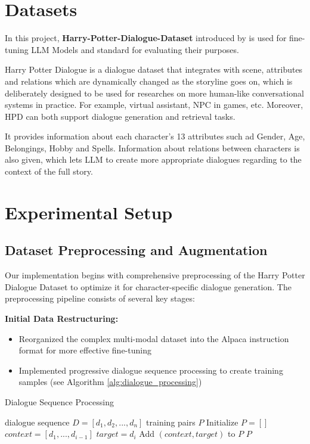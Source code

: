 \documentclass{article}
\begin{document}
\section{Datasets}
In this project, \textbf{Harry-Potter-Dialogue-Dataset} introduced by \cite{chen2023} is used for fine-tuning LLM Models and standard for evaluating their purposes.

Harry Potter Dialogue is a dialogue dataset that integrates with scene, attributes and relations which are dynamically changed as the storyline goes on, which is deliberately designed to be used for researches on more human-like conversational systems in practice. For example, virtual assistant, NPC in games, etc. Moreover, HPD can both support dialogue generation and retrieval tasks.

It provides information about each character's 13 attributes such ad Gender, Age, Belongings, Hobby and Spells. Information about relations between characters is also given, which lets LLM to create more appropriate dialogues regarding to the context of the full story.



\section{Experimental Setup}

\subsection{Dataset Preprocessing and Augmentation}
Our implementation begins with comprehensive preprocessing of the Harry Potter Dialogue Dataset to optimize it for character-specific dialogue generation. The preprocessing pipeline consists of several key stages:

\textbf{Initial Data Restructuring:}
\begin{itemize}
\item Reorganized the complex multi-modal dataset into the Alpaca instruction format for more effective fine-tuning
\item Implemented progressive dialogue sequence processing to create training samples (see Algorithm \ref{alg:dialogue_processing})
\end{itemize}

\begin{algorithm}[tb]
   \caption{Dialogue Sequence Processing}
   \label{alg:dialogue_processing}
\begin{algorithmic}
    dialogue sequence $D = [d_1, d_2, ..., d_n]$
    training pairs $P$
   \STATE Initialize $P = []$
      \STATE $context = [d_1, ..., d_{i-1}]$
      \STATE $target = d_i$
      \STATE Add $(context, target)$ to $P$
   \ENDFOR
   \RETURN $P$
\end{algorithmic}
\end{algorithm}
\end{document}
